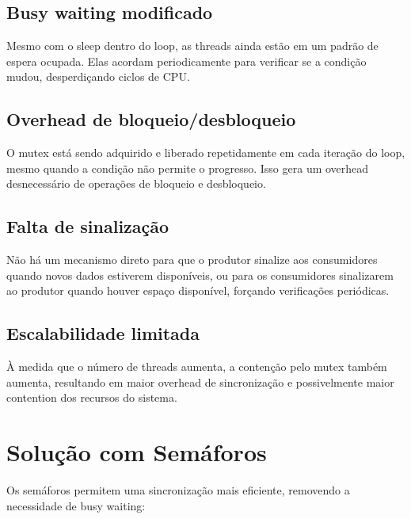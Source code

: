 \documentclass[12pt]{article}
\begin{document}
\subsection{Busy waiting modificado}
Mesmo com o sleep dentro do loop, as threads ainda estão em um padrão de espera ocupada. Elas acordam periodicamente para verificar se a condição mudou, desperdiçando ciclos de CPU.

\subsection{Overhead de bloqueio/desbloqueio}
O mutex está sendo adquirido e liberado repetidamente em cada iteração do loop, mesmo quando a condição não permite o progresso. Isso gera um overhead desnecessário de operações de bloqueio e desbloqueio.

\subsection{Falta de sinalização}
Não há um mecanismo direto para que o produtor sinalize aos consumidores quando novos dados estiverem disponíveis, ou para os consumidores sinalizarem ao produtor quando houver espaço disponível, forçando verificações periódicas.

\subsection{Escalabilidade limitada}
À medida que o número de threads aumenta, a contenção pelo mutex também aumenta, resultando em maior overhead de sincronização e possivelmente maior contention dos recursos do sistema.

\section{Solução com Semáforos}

Os semáforos permitem uma sincronização mais eficiente, removendo a necessidade de busy waiting:
\end{document}
